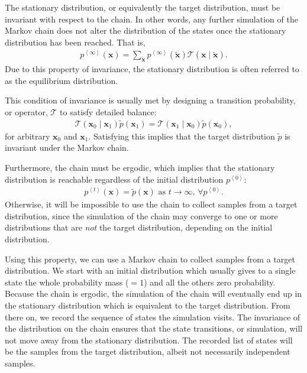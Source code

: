 \documentclass{now}
\newcommand{\qt}[1]{\left<#1\right>}
\newcommand{\vect}[1]{\mathbf{#1}}
\newcommand{\vx}[0]{\vect{x}}
\newcommand{\T}[0]{\mathcal{T}}
\begin{document}
The stationary distribution, or equivalently the target distribution, must be
invariant with respect to the chain.  In other words, any further simulation of
the Markov chain does not alter the distribution of the states once the
stationary distribution has been reached. That is,
\begin{align*}
    p^{\qt{\infty}}(\vx) = \sum_{\tilde{\vx}}
    p^{\qt{\infty}}(\tilde{\vx}) \T(\vx \mid \tilde{\vx}).
\end{align*}
Due to this property of invariance, the stationary distribution is often
referred to as the equilibrium distribution.

This condition of invariance is usually met by designing a transition
probability, or operator, $\T$ to satisfy detailed balance:
\begin{align*}
    \T(\vx_0 \mid \vx_1)\tilde{p}(\vx_1) = \T(\vx_1 \mid
    \vx_0)\tilde{p}(\vx_0),
\end{align*}
for arbitrary $\vx_{0}$ and $\vx_{1}$.  Satisfying this implies that the target
distribution $\tilde{p}$ is invariant under the Markov chain.

Furthermore, the chain must be ergodic, which implies that the stationary
distribution is reachable regardless of the initial distribution $p^{\qt{0}}$:
\begin{align}
    \label{eq:mcmc_ergodic}
    p^{\qt{t}}(\vx) = \tilde{p}(\vx)\text{ as }t \to
    \infty\text{, }\forall p^{\qt{0}}.
\end{align}
Otherwise, it will be impossible to use the chain to collect samples from a
target distribution, since the simulation of the chain may converge to one or
more distributions that are \textit{not} the target distribution, depending on
the initial distribution.

Using this property, we can use a Markov chain to collect samples from a target
distribution. We start with an initial distribution which usually gives to a
single state the whole probability mass ($=1$) and all the others zero
probability. Because the chain is ergodic, the simulation of the chain will
eventually end up in the stationary distribution which is equivalent to the
target distribution. From there on, we record the sequence of states the
simulation visits. The invariance of the distribution on the chain ensures that
the state transitions, or simulation, will not move away from the stationary
distribution. The recorded list of states will be the samples from the target
distribution, albeit not necessarily independent samples.
\end{document}
